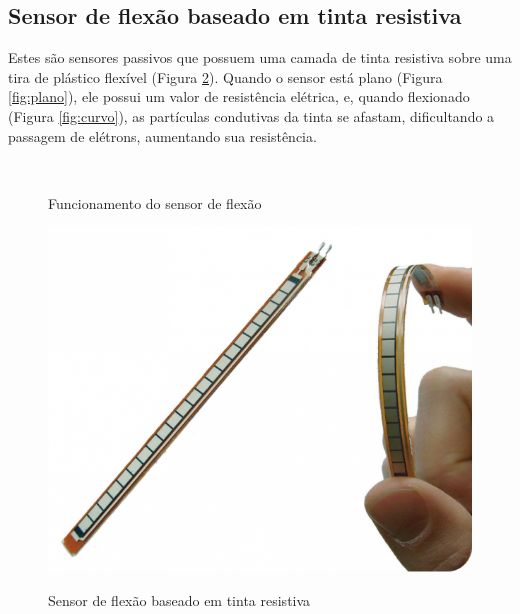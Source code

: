 \subsection{Sensor de flexão baseado em tinta resistiva}
\label{subsec:flextin}

Estes são sensores passivos que possuem uma camada de tinta resistiva sobre uma tira de plástico flexível (Figura \ref{fig:flextinta}). Quando o sensor está plano (Figura \ref{fig:plano}), ele possui um valor de resistência elétrica, e, quando flexionado (Figura \ref{fig:curvo}), as partículas condutivas da tinta se afastam, dificultando a passagem de elétrons, aumentando sua resistência.

\begin{figure}[H]
  \centering
  \setlength{\abovecaptionskip}{0pt}
  \setlength{\belowcaptionskip}{0pt}
  \caption[Funcionamento do sensor de flexão]{Funcionamento do sensor de flexão}
    \\
  \captionsetup{justification=centering}
  \label{fig:sensorflex}
\end{figure}

\begin{figure}[H]
  \setlength{\abovecaptionskip}{0pt}
  \setlength{\belowcaptionskip}{0pt}
  \caption[Sensor de flexão baseado em tinta resistiva]{Sensor de flexão baseado em tinta resistiva}
  \centering
  \includegraphics[width=.4\textwidth]{imagem/flexsensordirection}
  \captionsetup{justification=centering}
  \label{fig:flextinta}
\end{figure}

